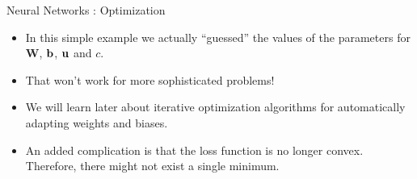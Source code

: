 \documentclass[11pt,compress,t,notes=noshow, xcolor=table]{beamer}
\begin{document}
\begin{frame} {Neural Networks : Optimization}
  \begin{itemize}
    \item In this simple example we actually \enquote{guessed} the values of the parameters for $\textbf{W}$, $\mathbf{b}$, $\mathbf{u}$ and $c$.
    \vspace{3mm}
    \item That won't work for more sophisticated problems!
    \vspace{3mm}
    \item We will learn later about iterative optimization algorithms for automatically adapting weights and biases.
    \vspace{3mm}
    \item An added complication is that the loss function is no longer convex. Therefore, there might not exist a single minimum. 
  \end{itemize}
\end{frame}

\endlecture
\end{document}
